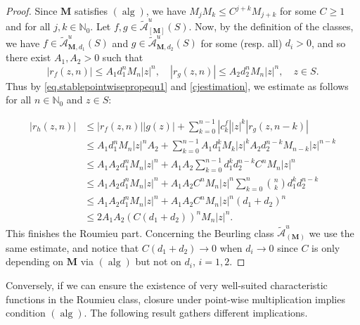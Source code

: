 \documentclass[11pt,a4paper]{article}
\theoremstyle{plain}
\theoremstyle{definition}
\newcommand{\NN}{\mathbb{N}}
\newcommand{\M}{\mathbf{M}}
\let\on=\operatorname
\begin{document}
\begin{proof} Since $\M$ satisfies \hyperlink{s-alg}{$(\on{alg})$}, we have $M_jM_k\le C^{j+k}M_{j+k}$ for some $C\geq 1$ and for all $j,k\in\NN_0$.
Let $f,g\in\mathcal{\widetilde{A}}^{u}_{[\M]}(S)$.  Now, by the definition of the classes, we have $f\in\mathcal{\widetilde{A}}^{u}_{\M,d_1}(S)$ and $g\in\mathcal{\widetilde{A}}^{u}_{\M,d_2}(S)$ for some (resp. all) $d_i>0$, and so there exist $A_1,A_2>0$ such that
$$
|r_f(z,n)|\le  A_1 d_1^n M_n|z|^n,\quad 
|r_g(z,n)|\le  A_2 d_2^n M_n|z|^n,\quad z\in S.
$$ 
Thus by \eqref{eq.stablepointwisepropequ1} and \eqref{cjestimation}, we estimate as follows for all $n\in\NN_0$ and $z\in S$:

\begin{align*}
|r_h(z,n)|&\le |r_f(z,n)||g(z)|+\sum_{k=0}^{n-1}|c^f_k||z|^k|r_g(z,n-k)|\\&
\le A_1 d_1^n M_n|z|^n A_2 + \sum_{k=0}^{n-1} A_1 d_1^k M_k|z|^k A_2 d_2^{n-k}M_{n-k}|z|^{n-k}
\\&
\le A_1A_2d_1^nM_n|z|^n + A_1A_2\sum_{k=0}^{n-1} d_1^k d_2^{n-k}C^nM_n|z|^n
\\&
\le A_1A_2d_1^nM_n|z|^n+A_1A_2C^nM_n|z|^n\sum_{k=0}^{n}\binom{n}{k}d_1^kd_2^{n-k}
\\&
\le A_1A_2d_1^nM_n|z|^n+ A_1A_2C^nM_n|z|^n(d_1+d_2)^n
\\&
\le 2A_1A_2(C(d_1+d_2))^nM_n|z|^n.
\end{align*}
This finishes the Roumieu part. Concerning the Beurling class $\mathcal{\widetilde{A}}^{u}_{(\M)}$ we use the same estimate, and notice that $C(d_1+d_2)\rightarrow 0$ when $d_i\rightarrow 0$ since $C$ is only depending on $\M$ via \hyperlink{s-alg}{$(\on{alg})$} but not on $d_i$, $i=1,2$.
\end{proof}

Conversely, if we can ensure the existence of very well-suited characteristic functions in the Roumieu class, closure under point-wise multiplication implies condition \hyperlink{s-alg}{$(\on{alg})$}. The following result gathers different implications.
\end{document}
